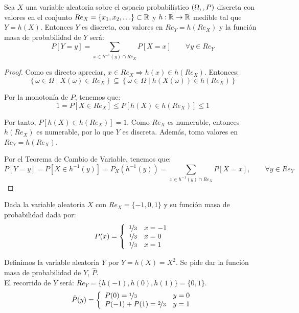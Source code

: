 \begin{coro}
    Sea $X$ una variable aleatoria sobre el espacio probabilístico $(\Omega,\/,P)$ discreta con valores en el conjunto $Re_X=\{x_1, x_2, \ldots\} \subset \mathbb R$ y $h:\mathbb R \rightarrow \mathbb R$ medible tal que $Y=h(X)$. Entonces $Y$ es discreta, con valores en $Re_Y=h(Re_X)$ y la función masa de probabilidad de $Y$ será:
    \begin{equation*}
        P[Y=y] = \sum_{x\in h^{-1}(y)\cap Re_X} P[X=x] \qquad \forall y \in Re_Y
    \end{equation*}
\end{coro}
\begin{proof}
    Como es directo apreciar, $x\in Re_X\Longrightarrow h(x)\in h(Re_X)$. Entonces:
    \begin{equation*}
        \left\{\omega \in \Omega \mid X(\omega) \in Re_X\right\} \subseteq \left\{\omega \in \Omega \mid h(X(\omega)) \in h(Re_X)\right\}
    \end{equation*}

    Por la monotonía de $P$, tenemos que:
    \begin{equation*}
        1=P[X\in Re_X] \leq P[h(X)\in h(Re_X)] \leq 1
    \end{equation*}

    Por tanto, $P[h(X)\in h(Re_X)]=1$. Como $Re_X$ es numerable, entonces $h(Re_X)$ es numerable, por lo que $Y$ es discreta. Además, toma valores en $Re_Y=h(Re_X)$.
    
    Por el Teorema de Cambio de Variable, tenemos que:
    \begin{equation*}
        P[Y=y]=P[X\in h^{-1}(y)] = P_X(h^{-1}(y)) = \sum_{x\in h^{-1}(y)\cap Re_X} P[X=x],\qquad \forall y \in Re_Y
    \end{equation*}
\end{proof}

\begin{ejemplo}
    Dada la variable aleatoria $X$ con $Re_X = \{-1, 0, 1\}$ y su función masa de probabilidad dada por:
    $$P(x) = \left\{ \begin{array}{cl}
        \nicefrac{1}{3} & x = -1 \\
        \nicefrac{1}{3} & x = 0  \\
        \nicefrac{1}{3} & x = 1
    \end{array} \right.$$
    
    
    Definimos la variable aleatoria $Y$ por $Y=h(X)=X^2$. Se pide dar la función masa de probabilidad de $Y$, $\hat{P}$.\\
    
    El recorrido de $Y$ será: $Re_Y = \{h(-1), h(0), h(1)\} = \{0, 1\}$.
    $$\hat{P}(y) = \left\{ \begin{array}{ll}
        P(0) = \nicefrac{1}{3}         & y = 0 \\
        P(-1) + P(1) = \nicefrac{2}{3} & y = 1
      \end{array} \right.$$
\end{ejemplo}

